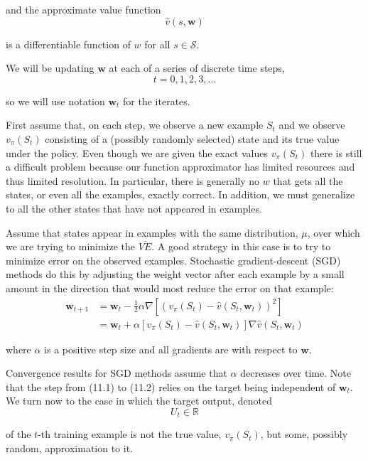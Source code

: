 \documentclass[11pt]{article}
\theoremstyle{plain} %
\theoremstyle{remark}
\begin{document}
and the approximate value function
$$
\hat{v}(s, \boldsymbol{w})
$$

is a differentiable function of $w$ for all $s \in \mathcal{S}$.

 We will be updating $\boldsymbol{w}$ at each of a series of discrete
  time steps, 
$$
t=0,1,2,3, \ldots
$$

so we will use notation $\boldsymbol{w}_{t}$ for the iterates.

 First assume that, on each step, we observe a new example $S_{t}$ and we
  observe $v_{\pi}\left(S_{t}\right)$ consisting of a (possibly randomly
  selected) state and its true value under the policy. Even though we are given the exact values $v_{\pi}\left(S_{t}\right)$
  there is still a difficult problem because our function approximator has
  limited resources and thus limited resolution. In particular, there is generally no $w$ that gets all the states, or
  even all the examples, exactly correct. In addition, we must generalize to all the other states that have not
  appeared in examples.

   Assume that states appear in examples with the same distribution, $\mu$,
  over which we are trying to minimize the $\overline{V E}$. A good strategy in this case is to try to minimize error on the observed
  examples. Stochastic gradient-descent (SGD) methods do this by adjusting the
  weight vector after each example by a small amount in the direction that would
  most reduce the error on that example: 
$$
\begin{aligned}
\boldsymbol{w}_{t+1} & =\boldsymbol{w}_{t}-\frac{1}{2} \alpha \nabla\left[\left(v_{\pi}\left(S_{t}\right)-\hat{v}\left(S_{t}, \boldsymbol{w}_{t}\right)\right)^{2}\right] \\
& =\boldsymbol{w}_{t}+\alpha\left[v_{\pi}\left(S_{t}\right)-\hat{v}\left(S_{t}, \boldsymbol{w}_{t}\right)\right] \nabla \hat{v}\left(S_{t}, \boldsymbol{w}_{t}\right)
\end{aligned}
$$

where $\alpha$ is a positive step size and all gradients are with respect to
$\boldsymbol{w}$.

 Convergence results for SGD methods assume that $\alpha$ decreases over
  time. Note that the step from (11.1) to (11.2) relies on the target being
  independent of $\boldsymbol{w}_{t}$.  We turn now to the case in which the target output, denoted
$$
U_{t} \in \mathbb{R}
$$

of the $t$-th training example is not the true value,
$v_{\pi}\left(S_{t}\right)$, but some, possibly random, approximation to it.
\end{document}
